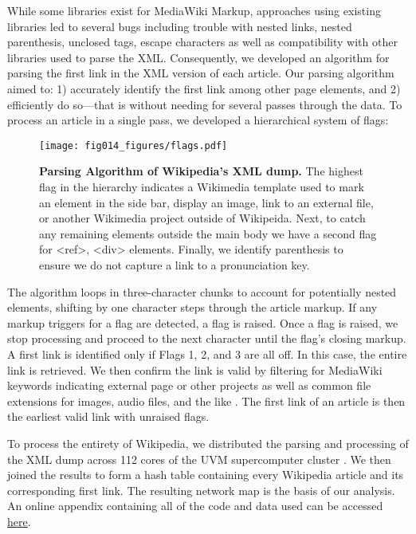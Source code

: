 \documentclass[pre,twocolumn,twoside,superscriptaddress,floatfix]{revtex4-1}
\begin{document}
{While some libraries exist for MediaWiki Markup,
approaches using existing libraries led to several bugs 
including trouble with nested links, nested parenthesis, unclosed tags, escape characters 
as well as compatibility with other libraries used to parse the XML.
Consequently,  we developed an algorithm for parsing the first link in the XML version of each article.
Our parsing algorithm aimed to: 
1) accurately identify the first link among other page elements, and 
2) efficiently do so---that is without needing for several passes through the data.
To process an article in a single pass, we developed a hierarchical system of flags:
\begin{figure}[tp!]
  \texttt{[image: fig014\_figures/flags.pdf]}  
  \caption{
    \textbf{Parsing Algorithm of Wikipedia's XML dump.}
The highest flag in the hierarchy indicates a Wikimedia template used to mark an element in the side bar, display an image, link to an external file, or another Wikimedia project outside of Wikipeida. Next, to catch any remaining elements outside the main body we have a second flag for <ref>, <div> elements. Finally, we identify parenthesis to ensure we do not capture a link to a pronunciation key.}
  \label{fig:parsing algorithm}
\end{figure}

The algorithm loops in three-character chunks to account for potentially nested elements, 
shifting by one character steps through the article markup.
If any markup triggers for a flag are detected, a flag is raised. 
Once a flag is raised, we stop processing and proceed to the next character
until the flag's closing markup.
A first link is identified only if Flags 1, 2, and 3 are all off.
In this case, the entire link is retrieved. 
We then confirm the link is valid by filtering for MediaWiki keywords indicating external page or other projects
as well as common file extensions for 
images, audio files, and the like 
\cite{media_wiki_templates}.
The first link of an article is then the earliest valid link with unraised flags.

To process the entirety of Wikipedia, we distributed the parsing and processing of the XML dump
across 112 cores of the UVM supercomputer cluster
\cite{vacc}.
We then joined the results to form a hash table containing every Wikipedia article and its corresponding
first link. The resulting network map is the basis of our analysis.
An online appendix containing all of the code and data used can be accessed \href{http://compstorylab.org/share/papers/ibrahim2016a/index.html}{here}.

}
\end{document}

